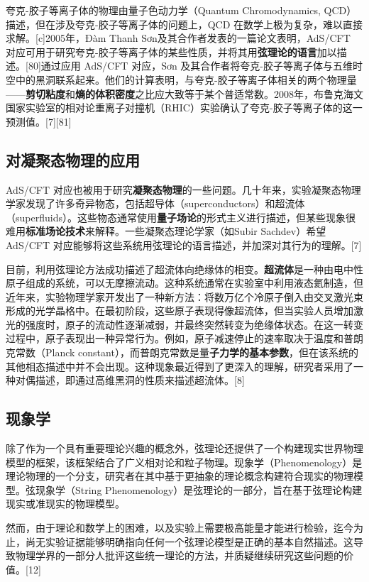 夸克-胶子等离子体的物理由量子色动力学（Quantum Chromodynamics, QCD）描述，但在涉及夸克-胶子等离子体的问题上，QCD 在数学上极为复杂，难以直接求解。[c]2005年，Đàm Thanh Sơn及其合作者发表的一篇论文表明，AdS/CFT 对应可用于研究夸克-胶子等离子体的某些性质，并将其用\textbf{弦理论的语言}加以描述。[80]通过应用 AdS/CFT 对应，Sơn 及其合作者将夸克-胶子等离子体与五维时空中的黑洞联系起来。他们的计算表明，与夸克-胶子等离子体相关的两个物理量——\textbf{剪切粘度}和\textbf{熵的体积密度}之比应大致等于某个普适常数。2008年，布鲁克海文国家实验室的相对论重离子对撞机（RHIC）实验确认了夸克-胶子等离子体的这一预测值。[7][81]
\subsection{对凝聚态物理的应用} 
AdS/CFT 对应也被用于研究\textbf{凝聚态物理}的一些问题。几十年来，实验凝聚态物理学家发现了许多奇异物态，包括超导体（superconductors）和超流体（superfluids）。这些物态通常使用\textbf{量子场论}的形式主义进行描述，但某些现象很难用\textbf{标准场论技术}来解释。一些凝聚态理论学家（如Subir Sachdev）希望AdS/CFT 对应能够将这些系统用弦理论的语言描述，并加深对其行为的理解。[7]  

目前，利用弦理论方法成功描述了超流体向绝缘体的相变。\textbf{超流体}是一种由电中性原子组成的系统，可以无摩擦流动。这种系统通常在实验室中利用液态氦制造，但近年来，实验物理学家开发出了一种新方法：将数万亿个冷原子倒入由交叉激光束形成的光学晶格中。在最初阶段，这些原子表现得像超流体，但当实验人员增加激光的强度时，原子的流动性逐渐减弱，并最终突然转变为绝缘体状态。在这一转变过程中，原子表现出一种异常行为。例如，原子减速停止的速率取决于温度和普朗克常数（Planck constant），而普朗克常数是量\textbf{子力学的基本参数}，但在该系统的其他相态描述中并不会出现。这种现象最近得到了更深入的理解，研究者采用了一种对偶描述，即通过高维黑洞的性质来描述超流体。[8]
\subsection{现象学} 
除了作为一个具有重要理论兴趣的概念外，弦理论还提供了一个构建现实世界物理模型的框架，该框架结合了广义相对论和粒子物理。现象学（Phenomenology）是理论物理的一个分支，研究者在其中基于更抽象的理论概念构建符合现实的物理模型。弦现象学（String Phenomenology）是弦理论的一部分，旨在基于弦理论构建现实或准现实的物理模型。  

然而，由于理论和数学上的困难，以及实验上需要极高能量才能进行检验，迄今为止，尚无实验证据能够明确指向任何一个弦理论模型是正确的基本自然描述。这导致物理学界的一部分人批评这些统一理论的方法，并质疑继续研究这些问题的价值。[12]

